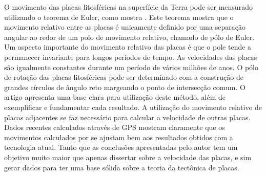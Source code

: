 \documentclass[manuscript]{geophysics}[10pt]
\begin{document}
O movimento das placas litosféricas na superfície da Terra pode ser mensurado utilizando o teorema de Euler, como mostra \cite{morgan_rises_1968}. Este teorema mostra que o movimento relativo entre as placas é unicamente definido por uma separação angular ao redor de um polo de movimento relativo, chamado de pólo de Euler. Um aspecto importante do movimento relativo das placas é que o pole tende a permanecer invariante para longos períodos de tempo. As velocidades das placas são igualmente constantes durante um período de vários milhões de anos. O pólo de rotação das placas litosféricas pode ser determinado com a construção de grandes círculos de ângulo reto margeando o ponto de intersecção comum. O artigo apresenta uma base clara para utilização deste método, além de exemplificar e fundamentar cada resultado. A utilização do movimento relativo de placas adjacentes se faz necessário para calcular a velocidade de outras placas. Dados recentes calculados através de GPS mostram claramente que os movimentos calculados por \cite{morgan_rises_1968} se ajustam bem aos resultados obtidos com a tecnologia atual. Tanto que as conclusões apresentadas pelo autor tem um objetivo muito maior que apenas dissertar sobre a velocidade das placas, e sim gerar dados para ter uma base sólida sobre a teoria da tectônica de placas.



    
\end{document}
